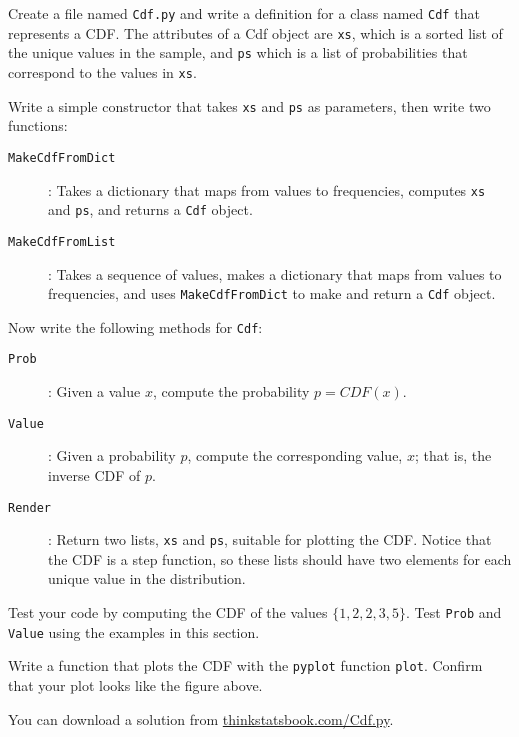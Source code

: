 \documentclass[10pt]{book}
\begin{document}
\begin{ex}
Create a file named {\tt Cdf.py} and write a definition for a class
named {\tt Cdf} that represents a CDF.  The attributes of a Cdf
object are {\tt xs}, which is a sorted list of the unique values
in the sample, and {\tt ps} which is a list of probabilities that
correspond to the values in {\tt xs}.

Write a simple constructor that takes {\tt xs} and {\tt ps} as
parameters, then write two functions:

\begin{description}

\item[{\tt MakeCdfFromDict}]: Takes a dictionary that maps from
values to frequencies, computes {\tt xs} and {\tt ps}, and returns
a {\tt Cdf} object.

\item[{\tt MakeCdfFromList}]: Takes a sequence of values, makes
a dictionary that maps from values to frequencies, and uses
{\tt MakeCdfFromDict} to make and return a {\tt Cdf} object.

\end{description}

Now write the following methods for {\tt Cdf}:

\begin{description}

\item[{\tt Prob}]: Given a value $x$, compute the probability $p = CDF(x)$.

\item[{\tt Value}]: Given a probability $p$, compute the
corresponding value, $x$; that is, the inverse CDF of $p$.

\item[{\tt Render}]: Return two lists, {\tt xs} and {\tt ps}, suitable
for plotting the CDF.  Notice that the CDF is a step function, so these
lists should have two elements for each unique value in the distribution.

\end{description}

Test your code by computing the CDF of the values $\{1, 2, 2, 3, 5\}$.
Test {\tt Prob} and {\tt Value} using the examples in this section.

Write a function that plots the CDF with the {\tt pyplot} function
{\tt plot}.  Confirm that your plot looks like the figure above.

You can download a solution from \url{thinkstatsbook.com/Cdf.py}.
\end{ex}
\end{document}
